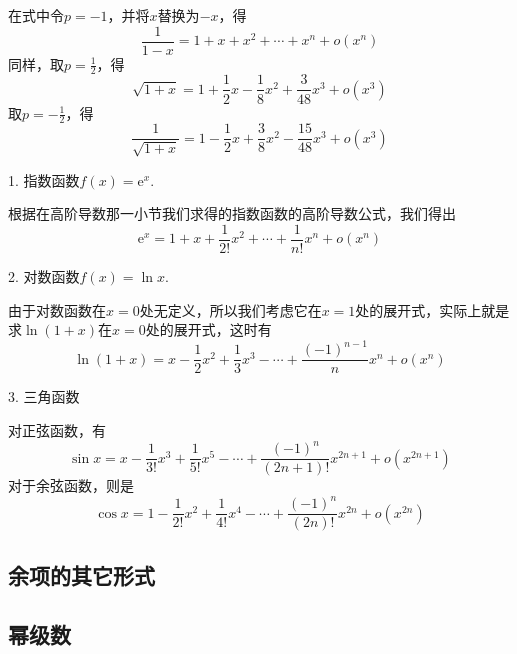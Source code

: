 在式中令$p=-1$，并将$x$替换为$-x$，得
\[ \frac{1}{1-x} = 1+x+x^2 + \cdots + x^n + o(x^n) \]
同样，取$p=\frac{1}{2}$，得
\[ \sqrt{1+x} = 1+\frac{1}{2}x-\frac{1}{8}x^2+\frac{3}{48}x^3 + o(x^3) \]
取$p=-\frac{1}{2}$，得
\[ \frac{1}{\sqrt{1+x}} = 1-\frac{1}{2}x+\frac{3}{8}x^2 -\frac{15}{48}x^3 + o(x^3) \]

1. 指数函数$f(x)=\mathrm{e}^x$.

根据在高阶导数那一小节我们求得的指数函数的高阶导数公式，我们得出
\[ \mathrm{e}^x = 1+x+\frac{1}{2!}x^2 + \cdots + \frac{1}{n!}x^n + o(x^n) \]

2. 对数函数$f(x)=\ln{x}$.

由于对数函数在$x=0$处无定义，所以我们考虑它在$x=1$处的展开式，实际上就是求$\ln{(1+x)}$在$x=0$处的展开式，这时有
\[ \ln{(1+x)} = x - \frac{1}{2} x^2 + \frac{1}{3} x^3 - \cdots + \frac{(-1)^{n-1}}{n}x^n + o(x^n) \]

3. 三角函数

对正弦函数，有
\[ \sin{x} = x - \frac{1}{3!}x^3 + \frac{1}{5!} x^5 - \cdots + \frac{(-1)^n}{(2n+1)!}x^{2n+1} + o(x^{2n+1}) \]
对于余弦函数，则是
\[ \cos{x} = 1 - \frac{1}{2!}x^2 + \frac{1}{4!}x^4 - \cdots + \frac{(-1)^n}{(2n)!}x^{2n} + o(x^{2n}) \]

\subsection{余项的其它形式}
\label{sec:other-format-of-taylor-additional}

\subsection{幂级数}
\label{sec:power-series}



